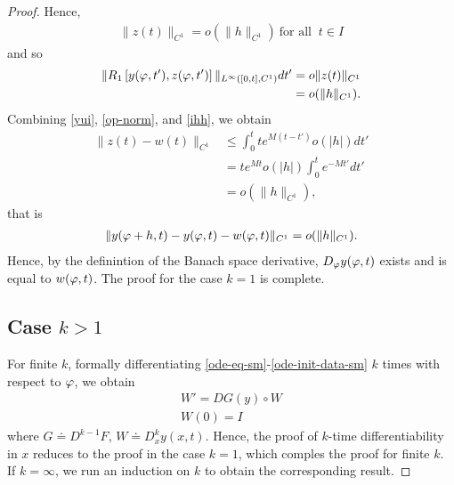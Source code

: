 \begin{proof}
%
%
Hence,
%
%
\begin{equation*}
\begin{split}
  \| z(t) \|_{C^{1}}  =  o (\| h \|_{C^{1}} ) \ \text{for all } \ t \in I
\end{split}
\end{equation*}
%
%
and so
%
\begin{equation}
  \begin{split}
    \label{ihh}
    \| R_{1}\left[ y(\varphi,t'), z(\varphi,t')
    \right] \|_{L^{\infty}\left( [0,t], C^{1} \right)} dt' 
    & = o\| z(t) \|_{C^{1}} 
    \\
    & = o(\| h \|_{C^{1}}).
  \end{split}
\end{equation}
%
%
%
Combining \eqref{yui}, \eqref{op-norm}, and \eqref{ihh}, we obtain
%
%
\begin{equation*}
\begin{split}
  \| z(t) - w(t) \|_{C^{1}} 
  & \le \int_{0}^{t} t e^{M(t - t')} o(| h
  |) dt'
  \\
  & = te^{Mt} o(| h |) \int_{0}^{t} e^{-Mt'} dt'
  \\
  & = o(\| h \|_{C^{1}}),
\end{split}
\end{equation*}
%
%
that is
%
%
\begin{equation*}
\begin{split}
  \| y(\varphi + h, t) - y(\varphi,t) - w(\varphi,t) \|_{C^{1}} = o(\| h \|_{C^{1}}).
\end{split}
\end{equation*}
%
%
Hence, by the definintion of the Banach space derivative, $D_{\varphi}y(\varphi,t)$
exists and is equal to $w(\varphi,t)$. The proof for the case $k=1$ is complete.
\subsection{Case $k >1$} 
\label{ssec:case-kg1}
For finite $k$, formally differentiating
\eqref{ode-eq-sm}-\eqref{ode-init-data-sm}
$k$ times with respect to $\varphi$, we obtain
\begin{gather*}
  W' = DG(y) \circ W
  \\
  W(0) = I
\end{gather*}
where $G \doteq D^{k-1}F$, $W \doteq D_{x}^{k} y(x,t)$. Hence, the proof of
$k$-time differentiability in $x$ reduces to the proof in the case $k=1$, which
comples the proof for finite $k$. If $k = \infty$, we run an induction on $k$ to
obtain the corresponding result.
\end{proof}

